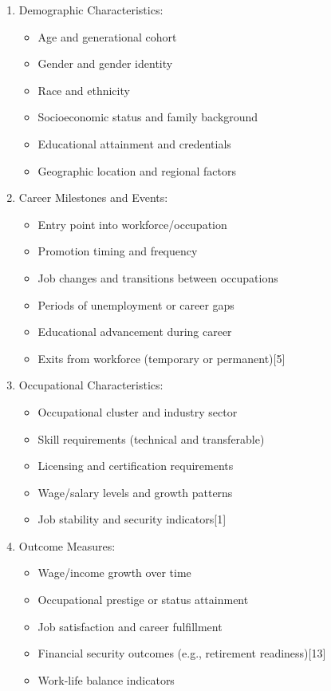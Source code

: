 \documentclass[
  letterpaper,
  DIV=11,
  numbers=noendperiod]{scrartcl}
\providecommand{\tightlist}{%
  \setlength{\itemsep}{0pt}\setlength{\parskip}{0pt}}
\begin{document}
\begin{enumerate}
\def\labelenumi{\arabic{enumi}.}
\tightlist
\item
  Demographic Characteristics:

  \begin{itemize}
  \tightlist
  \item
    Age and generational cohort
  \item
    Gender and gender identity
  \item
    Race and ethnicity
  \item
    Socioeconomic status and family background
  \item
    Educational attainment and credentials
  \item
    Geographic location and regional factors
  \end{itemize}
\item
  Career Milestones and Events:

  \begin{itemize}
  \tightlist
  \item
    Entry point into workforce/occupation
  \item
    Promotion timing and frequency
  \item
    Job changes and transitions between occupations
  \item
    Periods of unemployment or career gaps
  \item
    Educational advancement during career
  \item
    Exits from workforce (temporary or permanent){[}5{]}
  \end{itemize}
\item
  Occupational Characteristics:

  \begin{itemize}
  \tightlist
  \item
    Occupational cluster and industry sector
  \item
    Skill requirements (technical and transferable)
  \item
    Licensing and certification requirements
  \item
    Wage/salary levels and growth patterns
  \item
    Job stability and security indicators{[}1{]}
  \end{itemize}
\item
  Outcome Measures:

  \begin{itemize}
  \tightlist
  \item
    Wage/income growth over time
  \item
    Occupational prestige or status attainment
  \item
    Job satisfaction and career fulfillment
  \item
    Financial security outcomes (e.g., retirement readiness){[}13{]}
  \item
    Work-life balance indicators
  \end{itemize}
\end{enumerate}
\end{document}
